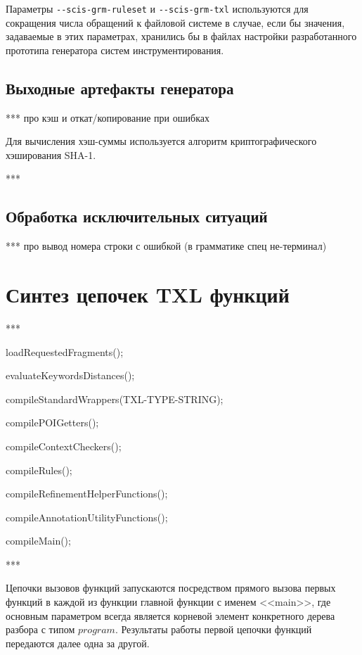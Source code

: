 Параметры \lstinline{--scis-grm-ruleset} и \lstinline{--scis-grm-txl} используются для сокращения числа обращений к файловой системе в случае, если бы значения, задаваемые в этих параметрах, хранились бы в файлах настройки разработанного прототипа генератора систем инструментирования.

\subsection{Выходные артефакты генератора}

***
про кэш и откат/копирование при ошибках

Для вычисления хэш-суммы используется алгоритм криптографического хэширования SHA-1.


***

\subsection{Обработка исключительных ситуаций}

***
про вывод номера строки с ошибкой (в грамматике спец не-терминал)

\section{Синтез цепочек TXL функций}

***

loadRequestedFragments();

evaluateKeywordsDistances();

compileStandardWrappers(TXL-TYPE-STRING);

compilePOIGetters();

compileContextCheckers();

compileRules();

compileRefinementHelperFunctions();

compileAnnotationUtilityFunctions();

compileMain();

***

Цепочки вызовов функций запускаются посредством прямого вызова первых функций в каждой из функции главной функции с именем <<main>>, где  основным параметром всегда является корневой элемент конкретного дерева разбора с типом $program$.
Результаты работы первой цепочки функций передаются далее одна за другой.

